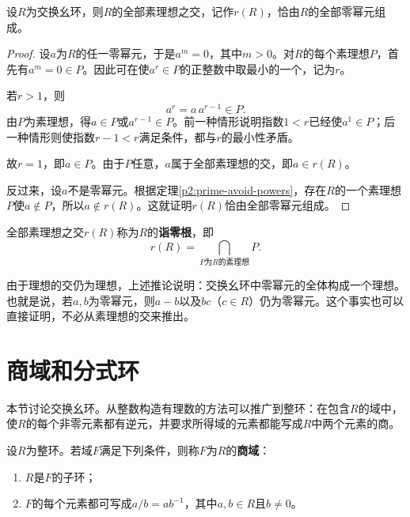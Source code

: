 \begin{corollary}
设$R$为交换幺环，则$R$的全部素理想之交，记作$r(R)$，恰由$R$的全部零幂元组成。
\end{corollary}
\begin{proof}
设$a$为$R$的任一零幂元，于是$a^m=0$，其中$m>0$。对$R$的每个素理想$P$，首先有$a^m=0\in P$。因此可在使$a^r\in P$的正整数中取最小的一个，记为$r$。

若$r>1$，则
\[
a^r=a\,a^{r-1}\in P.
\]
由$P$为素理想，得$a\in P$或$a^{r-1}\in P$。前一种情形说明指数$1<r$已经使$a^1\in P$；后一种情形则使指数$r-1<r$满足条件，都与$r$的最小性矛盾。

故$r=1$，即$a\in P$。由于$P$任意，$a$属于全部素理想的交，即$a\in r(R)$。

反过来，设$a$不是零幂元。根据定理\ref{p2:prime-avoid-powers}，存在$R$的一个素理想$P$使$a\notin P$，所以$a\notin r(R)$。这就证明$r(R)$恰由全部零幂元组成。
\end{proof}

\begin{definition}\label{p2:concept:c3-nilradical}
全部素理想之交$r(R)$称为$R$的\textbf{诣零根}，即
\[
r(R)=\bigcap_{P\text{为}R\text{的素理想}}P.
\]
\end{definition}

由于理想的交仍为理想，上述推论说明：交换幺环中零幂元的全体构成一个理想。也就是说，若$a,b$为零幂元，则$a-b$以及$bc$（$c\in R$）仍为零幂元。这个事实也可以直接证明，不必从素理想的交来推出。




\section{商域和分式环}

本节讨论交换幺环。从整数构造有理数的方法可以推广到整环：在包含$R$的域中，使$R$的每个非零元素都有逆元，并要求所得域的元素都能写成$R$中两个元素的商。

\begin{definition}\label{p2:concept:c3-fraction-field}
设$R$为整环。若域$F$满足下列条件，则称$F$为$R$的\textbf{商域}：
\begin{enumerate}
\item $R$是$F$的子环；
\item $F$的每个元素都可写成$a/b=ab^{-1}$，其中$a,b\in R$且$b\ne0$。
\end{enumerate}
\end{definition}

